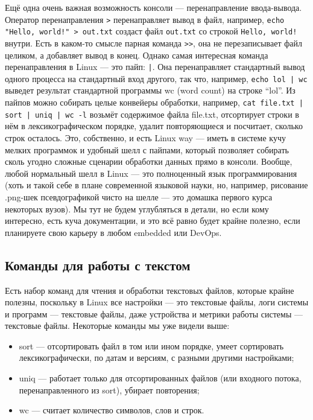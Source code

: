 \documentclass{../../text-style}
\begin{document}
Ещё одна очень важная возможность консоли --- перенаправление ввода-вывода.
Оператор перенаправления \verb|>| перенаправляет вывод в файл, например, \verb|echo "Hello, world!" > out.txt| создаст файл \verb|out.txt| со строкой \verb|Hello, world!| внутри.
Есть в каком-то смысле парная команда \verb|>>|, она не перезаписывает файл целиком, а добавляет вывод в конец.
Однако самая интересная команда перенаправления в Linux --- это пайп: \verb/|/.
Она перенаправляет стандартный вывод одного процесса на стандартный вход другого, так что, например, \verb/echo lol | wc/ выведет результат стандартной программы wc (word count) на строке \enquote{lol}.
Из пайпов можно собирать целые конвейеры обработки, например, \verb/cat file.txt | sort | uniq | wc -l/ возьмёт содержимое файла file.txt, отсортирует строки в нём в лексикографическом порядке, удалит повторяющиеся и посчитает, сколько строк осталось.
Это, собственно, и есть Linux way --- иметь в системе кучу мелких программок и удобный шелл с пайпами, который позволяет собирать сколь угодно сложные сценарии обработки данных прямо в консоли.
Вообще, любой нормальный шелл в Linux --- это полноценный язык программирования (хоть и такой себе в плане современной языковой науки, но, например, рисование .png-шек псевдографикой чисто на шелле --- это домашка первого курса некоторых вузов).
Мы тут не будем углубляться в детали, но если кому интересно, есть куча документации, и это всё равно будет крайне полезно, если планируете свою карьеру в любом embedded или DevOps.

\subsection{Команды для работы с текстом}

Есть набор команд для чтения и обработки текстовых файлов, которые крайне полезны, поскольку в Linux все настройки --- это текстовые файлы, логи системы и программ --- текстовые файлы, даже устройства и метрики работы системы --- текстовые файлы.
Некоторые команды мы уже видели выше:

\begin{itemize}
    \item sort --- отсортировать файл в том или ином порядке, умеет сортировать лексикографически, по датам и версиям, с разными другими настройками;
    \item uniq --- работает только для отсортированных файлов (или входного потока, перенаправленного из sort), убирает повторения;
    \item wc --- считает количество символов, слов и строк.
\end{itemize}
\end{document}
